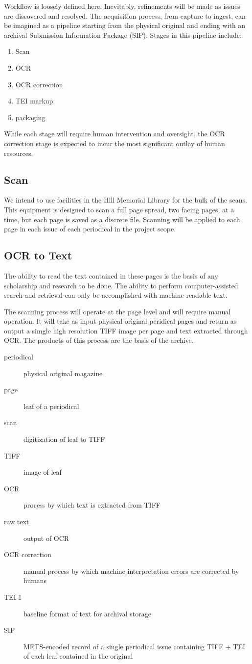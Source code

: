 Workflow is loosely defined here. Inevitably, refinements will be made as issues are discovered and resolved. The acquisition process, from capture to ingest, can be imagined as a pipeline starting from the physical original and ending with an archival Submission Information Package (SIP). Stages in this pipeline include: 
\begin{enumerate}
  \item{Scan}
  \item{OCR}
  \item{OCR correction}
  \item{TEI markup}
  \item{packaging}
\end{enumerate}
While each stage will require human intervention and oversight, the OCR correction stage is expected to incur the most significant outlay of human resources. 
\subsection{Scan}
We intend to use facilities in the Hill Memorial Library for the bulk of the scans. This equipment is designed to scan a full page spread, two facing pages, at a time, but each page is saved as a discrete file. Scanning will be applied to each page in each issue of each periodical in the project scope.
\subsection{OCR to Text}
The ability to read the text contained in these pages is the basis of any scholarship and research to be done. The ability to perform computer-assisted search and retrieval can only be accomplished with machine readable text. 


The scanning process will operate at the page level and will require manual operation. It will take as input physical original peridical pages and return as output a simgle high resolution TIFF image per page and text extracted through OCR. The products of this process are the basis of the archive.
\begin{description}
  \item[periodical]{physical original magazine}
  \item[page]{leaf of a periodical}
  \item[scan]{digitization of leaf to TIFF}
  \item[TIFF]{image of leaf}
  \item[OCR]{process by which text is extracted from TIFF}
  \item[raw text]{output of OCR}
  \item[OCR correction]{manual process by which machine interpretation errors are corrected by humans}
  \item[TEI-1]{baseline format of text for archival storage}
  \item[SIP]{METS-encoded record of a single periodical issue containing TIFF + TEI of each leaf contained in the original}
\end{description}

